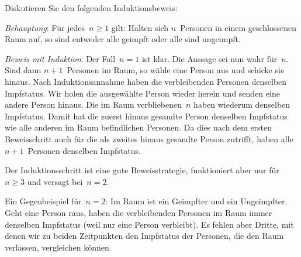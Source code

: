 \documentclass[a4paper]{article}
\begin{document}
\begin{problem}[B01.A2]
    Diskutieren Sie den folgenden Induktionsbeweis:

    \emph{Behauptung}: Für jedes~$n \geq 1$ gilt: Halten sich $n$~Personen in einem geschlossenen Raum auf, so sind entweder alle geimpft oder alle sind ungeimpft.

    \emph{Beweis mit Induktion}: Der Fall~$n = 1$ ist klar. Die Aussage sei nun wahr für~$n$. Sind dann $n+1$~Personen im Raum, so wähle eine Person aus und schicke sie hinaus. Nach Induktionsannahme haben die verbleibenden Personen denselben Impfstatus. Wir holen die ausgewählte Person wieder herein und senden eine andere Person hinaus. Die im Raum verbliebenen~$n$ haben wiederum denselben Impfstatus. Damit hat die zuerst hinaus gesandte Person denselben Impfstatus wie alle anderen im Raum befindlichen Personen. Da dies nach dem ersten Beweisschritt auch für die als zweites hinaus gesandte Person zutrifft, haben alle $n+1$~Personen denselben Impfstatus.
\end{problem}

\begin{solution}
    Der Induktionsschritt ist eine gute Beweisstrategie, funktioniert aber nur für~$n \geq 3$ und versagt bei~$n = 2$.

    Ein Gegenbeispiel für~$n = 2$: Im Raum ist ein Geimpfter und ein Ungeimpfter. Geht eine Person raus, haben die verbleibenden Personen im Raum immer denselben Impfstatus (weil nur eine Person verbleibt). Es fehlen aber Dritte, mit denen wir zu beiden Zeitpunkten den Impfstatus der Personen, die den Raum verlassen, vergleichen können.

    \begin{center}
    \end{center}
\end{solution}
\end{document}
